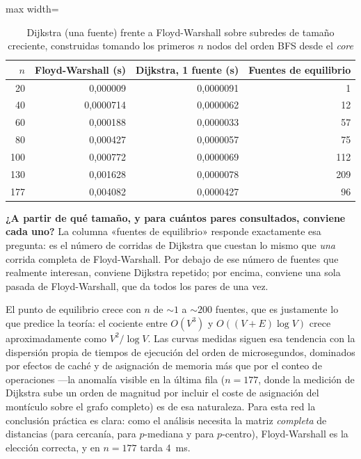 \documentclass[10pt,a4paper]{extarticle}
\begin{document}
\begin{table}[H]
\centering
\caption{Dijkstra (una fuente) frente a Floyd-Warshall sobre subredes de tamaño creciente,
construidas tomando los primeros $n$ nodos del orden BFS desde el \textit{core}}
\label{tab:tiempos}
\small
\begin{adjustbox}{max width=\textwidth}
\begin{tabular}{rrrr}
\toprule
$n$ & \textbf{Floyd-Warshall (s)} & \textbf{Dijkstra, 1 fuente (s)} & \textbf{Fuentes de equilibrio} \\
\midrule
20  & 0,000009  & 0,0000091 & 1 \\
40  & 0,0000714 & 0,0000062 & 12 \\
60  & 0,000188  & 0,0000033 & 57 \\
80  & 0,000427  & 0,0000057 & 75 \\
100 & 0,000772  & 0,0000069 & 112 \\
130 & 0,001628  & 0,0000078 & 209 \\
177 & 0,004082  & 0,0000427 & 96 \\
\bottomrule
\end{tabular}
\end{adjustbox}
\end{table}

\textbf{¿A partir de qué tamaño, y para cuántos pares consultados, conviene cada uno?} La
columna «fuentes de equilibrio» responde exactamente esa pregunta: es el número de corridas
de Dijkstra que cuestan lo mismo que \textit{una} corrida completa de Floyd-Warshall. Por
debajo de ese número de fuentes que realmente interesan, conviene Dijkstra repetido; por
encima, conviene una sola pasada de Floyd-Warshall, que da todos los pares de una vez.

El punto de equilibrio crece con $n$ de $\sim 1$ a $\sim 200$ fuentes, que es justamente lo
que predice la teoría: el cociente entre $O(V^3)$ y $O((V+E)\log V)$ crece
aproximadamente como $V^2/\log V$. Las curvas medidas siguen esa tendencia con la dispersión
propia de tiempos de ejecución del orden de microsegundos, dominados por efectos de caché y
de asignación de memoria más que por el conteo de operaciones ---la anomalía visible en la
última fila ($n=177$, donde la medición de Dijkstra sube un orden de magnitud por incluir el
coste de asignación del montículo sobre el grafo completo) es de esa naturaleza. Para esta
red la conclusión práctica es clara: como el análisis necesita la matriz \textit{completa}
de distancias (para cercanía, para $p$-mediana y para $p$-centro), Floyd-Warshall es la
elección correcta, y en $n = 177$ tarda 4~ms.
\end{document}
